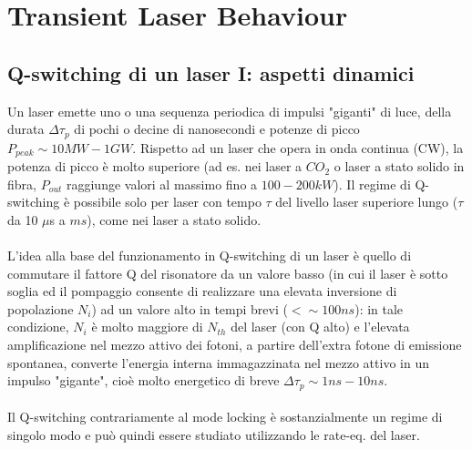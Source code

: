 \documentclass{book}
\def \D {\Delta}
\theoremstyle{remark}
\begin{document}
\section{Transient Laser Behaviour}
\subsection{Q-switching di un laser I: aspetti dinamici}
Un laser emette uno o una sequenza periodica di impulsi "giganti" di luce, della durata $\D\tau_p$ di pochi o decine di nanosecondi e potenze di picco $P_{peak} \sim 10 MW - 1 GW$.
Rispetto ad un laser che opera in onda continua (CW), la potenza di picco è molto superiore (ad es. nei laser a $CO_2$ o laser a stato solido in fibra, $P_{out}$ raggiunge valori al massimo fino a $100-200 kW$). Il regime di Q-switching è possibile solo per laser con tempo $\tau$ del livello laser superiore lungo ($\tau$ da 10 $\mu$s a $ms$), come nei laser a stato solido.\\
\\
L'idea alla base del funzionamento in Q-switching di un laser è quello di commutare il fattore Q del risonatore da un valore basso (in cui il laser è sotto soglia ed il pompaggio consente di realizzare una elevata inversione di popolazione $N_i$) ad un valore alto in tempi brevi ($< \sim 100 ns$): in tale condizione, $N_i$ è molto maggiore di $N_{th}$ del laser (con Q alto) e l'elevata amplificazione nel mezzo attivo dei fotoni, a partire dell'extra fotone di emissione spontanea, converte l'energia interna immagazzinata nel mezzo attivo in un impulso "gigante", cioè molto energetico di breve $\D\tau_p \sim 1 ns - 10 ns$.\\
\\
Il Q-switching contrariamente al mode locking è sostanzialmente un regime di singolo modo e può quindi essere studiato utilizzando le rate-eq. del laser.
\end{document}
